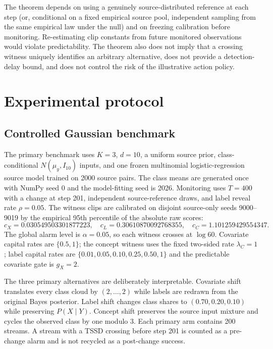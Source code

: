 \documentclass[11pt,a4paper]{article}
\theoremstyle{definition}
\newcommand{\1}{\mathbf{1}}
\begin{document}
The theorem depends on using a genuinely source-distributed reference at each step (or, conditional on a fixed empirical source pool, independent sampling from the same empirical law under the null) and on freezing calibration before monitoring. Re-estimating clip constants from future monitored observations would violate predictability. The theorem also does not imply that a crossing witness uniquely identifies an arbitrary alternative, does not provide a detection-delay bound, and does not control the risk of the illustrative action policy.

\section{Experimental protocol}
\label{sec:protocol}

\subsection{Controlled Gaussian benchmark}
The primary benchmark uses $K=3$, $d=10$, a uniform source prior, class-conditional $N(\mu_y,I_{10})$ inputs, and one frozen multinomial logistic-regression source model trained on 2000 source pairs. The class means are generated once with NumPy seed 0 and the model-fitting seed is 2026. Monitoring uses $T=400$ with a change at step 201, independent source-reference draws, and label reveal rate $\rho=0.05$. The witness clips are calibrated on disjoint source-only seeds 9000--9019 by the empirical 95th percentile of the absolute raw scores:
\[
c_X=0.030549503301877223,\quad c_L=0.30610870092768355,\quad c_C=1.101259429554347.
\]
The global alarm level is $\alpha=0.05$, so each witness crosses at $\log60$. Covariate capital rates are $\{0.5,1\}$; the concept witness uses the fixed two-sided rate $\lambda_C=1$; label capital rates are $\{0.01,0.05,0.10,0.25,0.50,1\}$ and the predictable covariate gate is $g_X=2$.

The three primary alternatives are deliberately interpretable. Covariate shift translates every class cloud by $(2,\ldots,2)$ while labels are redrawn from the original Bayes posterior. Label shift changes class shares to $(0.70,0.20,0.10)$ while preserving $P(X\mid Y)$. Concept shift preserves the source input mixture and cycles the observed class by one modulo 3. Each primary arm contains 200 streams. A stream with a TSSD crossing before step 201 is counted as a pre-change alarm and is not recycled as a post-change success.
\end{document}
